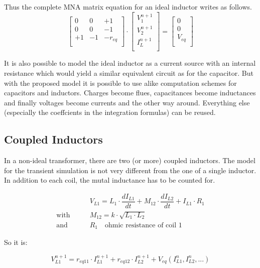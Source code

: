 Thus the complete MNA matrix equation for an ideal inductor writes
as follows.
\begin{equation}
\begin{bmatrix}
0 & 0 & +1\\
0 & 0 & -1\\
+1 & -1 & -r_{eq}\\
\end{bmatrix}
\cdot
\begin{bmatrix}
V_1^{n+1}\\
V_2^{n+1}\\
I_L^{n+1}\\
\end{bmatrix}
=
\begin{bmatrix}
0\\
0\\
V_{eq}\\
\end{bmatrix}
\end{equation}

It is also possible to model the ideal inductor as a current source with
an internal resistance which would yield a similar equivalent circuit
as for the capacitor.  But with the proposed model it is possible to
use alike computation schemes for capacitors and inductors.  Charges
become flues, capacitances become inductances and finally voltages
become currents and the other way around.  Everything else (especially
the coeffcients in the integration formulas) can be reused.


\subsection{Coupled Inductors}

In a non-ideal transformer, there are two (or more) coupled inductors.
The model for the transient simulation is not very different from the
one of a single inductor. In addition to each coil, the mutal inductance
has to be counted for.

\begin{align}
 & V_{L1} = L_1\cdot\dfrac{d I_{L1}}{d t} + M_{12}\cdot\dfrac{d I_{L2}}{d t}
            + I_{L1}\cdot R_1 \\
\text{with}\qquad & M_{12} = k\cdot\sqrt{L_1\cdot L_2} \\
\text{and}\qquad  & R_1 \quad\text{ohmic resistance of coil 1}
\end{align}

So it is:

\begin{equation}
V_{L1}^{n+1} = r_{eq11}\cdot I_{L1}^{n+1} + r_{eq12}\cdot I_{L2}^{n+1}
             + V_{eq}(I_{L1}^n, I_{L2}^n, ...)
\end{equation}


